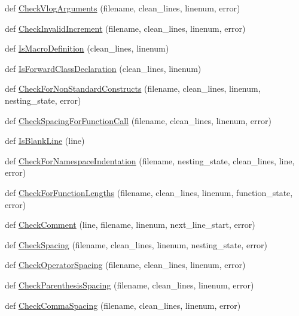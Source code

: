 \begin{DoxyCompactItemize}
def \hyperlink{namespacecpplint_ab066834feaa7bf5a92982bbfb0af89c1}{Check\+Vlog\+Arguments} (filename, clean\+\_\+lines, linenum, error)
\item 
def \hyperlink{namespacecpplint_a8b47da46bc61f72ab12e9228acc3a0cd}{Check\+Invalid\+Increment} (filename, clean\+\_\+lines, linenum, error)
\item 
def \hyperlink{namespacecpplint_a5a95ee1e23638e172a3361723503329c}{Is\+Macro\+Definition} (clean\+\_\+lines, linenum)
\item 
def \hyperlink{namespacecpplint_adde7d60b6354b40d9ef9acda6e847d7b}{Is\+Forward\+Class\+Declaration} (clean\+\_\+lines, linenum)
\item 
def \hyperlink{namespacecpplint_a954b179c4037e5da8ac599cce095c37e}{Check\+For\+Non\+Standard\+Constructs} (filename, clean\+\_\+lines, linenum, nesting\+\_\+state, error)
\item 
def \hyperlink{namespacecpplint_a2ea8b2c917d5ce466287e1c6fe26f0db}{Check\+Spacing\+For\+Function\+Call} (filename, clean\+\_\+lines, linenum, error)
\item 
def \hyperlink{namespacecpplint_adf59429f3dd145e978624fe239809260}{Is\+Blank\+Line} (line)
\item 
def \hyperlink{namespacecpplint_a7c5964127d06521a2a05fbb28cc26478}{Check\+For\+Namespace\+Indentation} (filename, nesting\+\_\+state, clean\+\_\+lines, line, error)
\item 
def \hyperlink{namespacecpplint_a2699a7cad55a82cab5f73c012747203e}{Check\+For\+Function\+Lengths} (filename, clean\+\_\+lines, linenum, function\+\_\+state, error)
\item 
def \hyperlink{namespacecpplint_af126b85f4c25f359c40ce349f4eb7a2d}{Check\+Comment} (line, filename, linenum, next\+\_\+line\+\_\+start, error)
\item 
def \hyperlink{namespacecpplint_a73e82f51a8d59c816db26b5f797b3431}{Check\+Spacing} (filename, clean\+\_\+lines, linenum, nesting\+\_\+state, error)
\item 
def \hyperlink{namespacecpplint_a6a15b27f48cfd70fbf76f595c34f6d9e}{Check\+Operator\+Spacing} (filename, clean\+\_\+lines, linenum, error)
\item 
def \hyperlink{namespacecpplint_aacf5fa793ab27c7038e376d6a4c53d87}{Check\+Parenthesis\+Spacing} (filename, clean\+\_\+lines, linenum, error)
\item 
def \hyperlink{namespacecpplint_a46d2c48a2d4e747feee44616af987bdf}{Check\+Comma\+Spacing} (filename, clean\+\_\+lines, linenum, error)
\item 

\end{DoxyCompactItemize}
